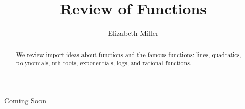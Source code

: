 \documentclass{ximera}
\author{Elizabeth Miller}
\title{Review of Functions}
\begin{document}
\licenseOS
\begin{abstract}
   We review import ideas about functions and the famous functions: lines, quadratics, polynomials, nth roots, exponentials, logs, and rational functions.
\end{abstract}
\maketitle

Coming Soon


%
%
%
%
%
\end{document}
